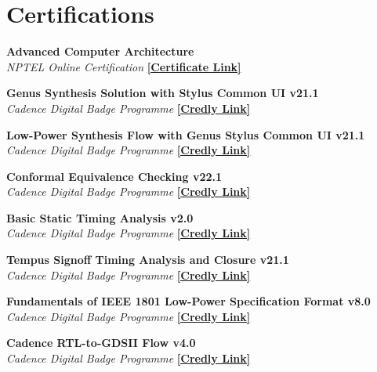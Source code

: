 \section{\sc Certifications}

{\bf{Advanced Computer Architecture }} \\
\textit{NPTEL Online Certification}
\href{https://archive.nptel.ac.in/content/noc/NOC23/SEM1/Ecertificates/106/noc23-cs07/Course/NPTEL23CS07S5323401304248775.jpg}{{\bf[Certificate Link]}}


{\bf{Genus Synthesis Solution with Stylus Common UI v21.1}} \\
\textit{Cadence Digital Badge Programme} 
\href{https://www.credly.com/badges/fc9243f2-ca59-4cf6-b2a0-4f01a284d005}{{\bf[Credly Link]}}

{\bf{Low-Power Synthesis Flow with Genus Stylus Common UI v21.1}} \\
\textit{Cadence Digital Badge Programme} 
\href{https://www.credly.com/badges/574c0d1c-5e5f-4b63-bbec-34bf15f34715}{{\bf[Credly Link]}}

{\bf{Conformal Equivalence Checking v22.1}} \\
\textit{Cadence Digital Badge Programme} 
\href{https://www.credly.com/badges/5662fd4d-f91e-4f24-9ff9-030c9c8a806e}{{\bf[Credly Link]}}

{\bf{Basic Static Timing Analysis v2.0}} \\
\textit{Cadence Digital Badge Programme} 
\href{https://www.credly.com/badges/a86a351b-9722-4ee5-8fe0-0ac785ead4e7}{{\bf[Credly Link]}}

{\bf{Tempus Signoff Timing Analysis and Closure v21.1}} \\
\textit{Cadence Digital Badge Programme} 
\href{https://www.credly.com/badges/233a9c95-dda6-4e62-af14-dd33d5e06c6d}{{\bf[Credly Link]}}

{\bf{Fundamentals of IEEE 1801 Low-Power Specification Format v8.0}} \\
\textit{Cadence Digital Badge Programme} 
\href{https://www.credly.com/badges/76d37ce1-0283-4ce9-b084-7f8a1c5ceb2e}{{\bf[Credly Link]}}

{\bf{Cadence RTL-to-GDSII Flow v4.0}} \\
\textit{Cadence Digital Badge Programme} 
\href{https://www.credly.com/badges/fca2b565-9ed0-4791-a0b7-0f0ff65f79da}{{\bf[Credly Link]}}

